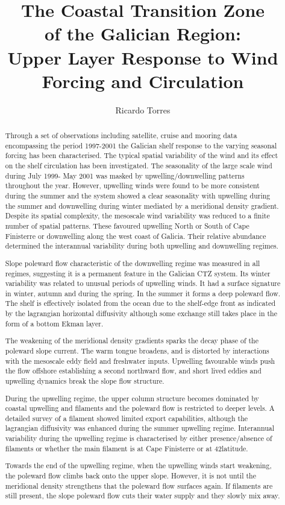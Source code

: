 \documentclass[sos,noblankpages,12pt,twoside]{mythesis}
\title{The Coastal Transition Zone \\ of the Galician Region:\\
Upper Layer Response to Wind Forcing and Circulation}
\author{Ricardo Torres}{Torres, Ricardo}
\begin{document}
\maketitle
\begin{abstract}
Through a set of observations including satellite, cruise and
mooring data encompassing the period 1997-2001 the Galician shelf
response to the varying seasonal forcing  has been  characterised.
The typical spatial variability of the wind and its effect on the
shelf circulation has been investigated. The seasonality of the
large scale wind during July 1999- May 2001 was masked by
upwelling/downwelling patterns throughout the year. However,
upwelling winds were found to be more consistent during the summer
and the system showed a clear seasonality with upwelling during
the summer and downwelling during winter mediated by a meridional
density gradient. Despite its spatial complexity, the mesoscale
wind variability was reduced to a finite number of spatial
patterns. These favoured upwelling North or South of Cape
Finisterre or downwelling along the west coast of Galicia. Their
relative abundance determined the interannual variability during
both upwelling and downwelling regimes.

Slope poleward flow characteristic of the downwelling regime was
measured in all regimes, suggesting it is a permanent feature in
the Galician CTZ system. Its winter variability was related to
unusual periods of upwelling winds. It had a surface signature in
winter, autumn and during the spring. In the summer it forms a
deep poleward flow. The shelf is effectively isolated from the
ocean due to the shelf-edge front as indicated by the lagrangian
horizontal diffusivity although some exchange still takes place in
the form of a bottom Ekman layer.

The weakening of the meridional density gradients sparks the decay
phase of the poleward slope current. The warm tongue broadens, and
is distorted by interactions with the mesoscale eddy field and
freshwater inputs. Upwelling favourable winds push the flow
offshore establishing a second northward flow, and short lived
eddies and upwelling dynamics break the slope flow structure.

During the upwelling regime, the upper column structure becomes
dominated by coastal upwelling and filaments and the poleward flow
is restricted to deeper levels. A detailed survey of a filament
showed limited export capabilities, although the lagrangian
diffusivity was enhanced during the summer upwelling regime.
Interannual variability during the upwelling regime is
characterised by either presence/absence of filaments or whether
the main filament is at Cape Finisterre or at 42\deg latitude.

Towards the end of the upwelling regime, when the upwelling winds
start weakening, the poleward flow climbs back onto the upper
slope. However, it is not until the meridional density strengthens
that the poleward flow surfaces again. If filaments are still
present, the slope poleward flow cuts their water supply and they
slowly mix away.

\end{abstract}
\end{document}
